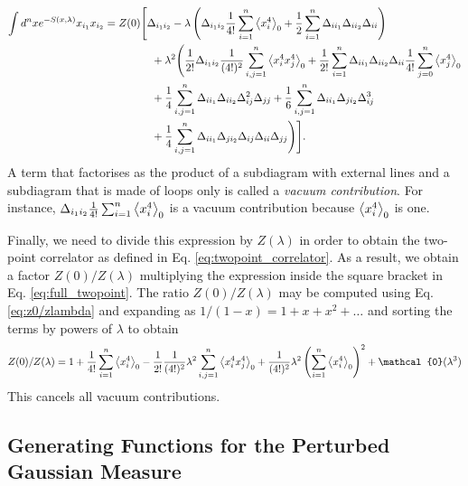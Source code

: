 \documentclass{article}
\numberwithin{equation}{section}
\begin{document}
\begin{itemize}
    \begin{equation} \label{eq:full_twopoint}
    \begin{aligned}
        \int d^nx e^{-S(x, \lambda)} x_{i_1} x_{i_2} = Z(0) &\Biggl[ \Delta_{i_1 i_2} - \lambda \left(\Delta_{i_1 i_2} \frac{1}{4!} \sum_{i=1}^n \ev{x_i^4}_0 + \frac{1}{2} \sum_{i=1}^n \Delta_{ii_1} \Delta_{ii_2} \Delta_{ii}\right) \\
        &\quad + \lambda^2\Biggl( \frac{1}{2!}\Delta_{i_1 i_2} \frac{1}{(4!)^2} \sum_{i,j=1}^n \ev{x_i^4 x_j^4}_0 + \frac{1}{2!}\sum_{i=1}^n \Delta_{ii_1} \Delta_{ii_2} \Delta_{ii} \frac{1}{4!}\sum_{j=0}^n \ev{x_j^4}_0 \\
        &\quad + \frac{1}{4} \sum_{i,j=1}^n \Delta_{ii_1} \Delta_{ii_2} \Delta_{ij}^2 \Delta_{jj} + \frac{1}{6} \sum_{i,j=1}^n \Delta_{ii_1} \Delta_{ji_2} \Delta_{ij}^3 \\
        &\quad + \frac{1}{4} \sum_{i,j=1}^n \Delta_{ii_1} \Delta_{ji_2} \Delta_{ij} \Delta_{ii } \Delta_{jj} \Biggr)\Biggr].
    \end{aligned}
    \end{equation}
    A term that factorises as the product of a subdiagram with external lines and a subdiagram that is made of loops only is called a \textit{vacuum contribution}. For instance, $\Delta_{i_1 i_2} \frac{1}{4!} \sum_{i=1}^n \ev{x_i^4}_0$ is a vacuum contribution because $\ev{x_i^4}_0$ is one. 

    Finally, we need to divide this expression by $Z(\lambda)$ in order to obtain the two-point correlator as defined in Eq. \ref{eq:twopoint_correlator}. As a result, we obtain a factor $Z(0)/Z(\lambda)$ multiplying the expression inside the square bracket in Eq. \ref{eq:full_twopoint}. The ratio $Z(0)/Z(\lambda)$ may be computed using Eq. \ref{eq:z0/zlambda} and expanding as $1/(1-x) = 1 + x + x^2 + \dots$ and sorting the terms by powers of $\lambda$ to obtain
    \begin{equation}
        Z(0)/Z(\lambda) = 1 + \frac{1}{4!} \sum_{i=1}^n \ev{x_i^4}_0 - \frac{1}{2!} \frac{1}{(4!)^2} \lambda^2 \sum_{i,j=1}^n \ev{x_i^4 x_j^4}_0 + \frac{1}{(4!)^2} \lambda^2 \left(\sum_{i=1}^n \ev{x_i^4}_0 \right)^2 + \mathcal{0}(\lambda^3)
    \end{equation}
    This cancels all vacuum contributions. %
\end{itemize}

\subsection{Generating Functions for the Perturbed Gaussian Measure}
\end{document}
